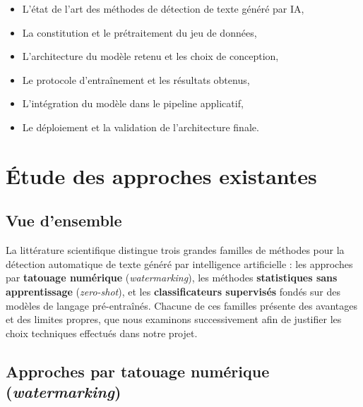 ﻿\documentclass[12pt, a4paper]{report}
\begin{document}
\begin{itemize}
  \item L'état de l'art des méthodes de détection de texte généré par IA,
  \item La constitution et le prétraitement du jeu de données,
  \item L'architecture du modèle retenu et les choix de conception,
  \item Le protocole d'entraînement et les résultats obtenus,
  \item L'intégration du modèle dans le pipeline applicatif,
  \item Le déploiement et la validation de l'architecture finale.
\end{itemize}



\chapter{Étude des approches existantes}

\section{Vue d'ensemble}

La littérature scientifique distingue trois grandes familles de méthodes pour 
la détection automatique de texte généré par intelligence artificielle : les 
approches par \textbf{tatouage numérique} (\textit{watermarking}), les méthodes 
\textbf{statistiques sans apprentissage} (\textit{zero-shot}), et les 
\textbf{classificateurs supervisés} fondés sur des modèles de langage 
pré-entraînés. Chacune de ces familles présente des avantages et des limites 
propres, que nous examinons successivement afin de justifier les choix 
techniques effectués dans notre projet.

\section{Approches par tatouage numérique (\textit{watermarking})}
\end{document}
